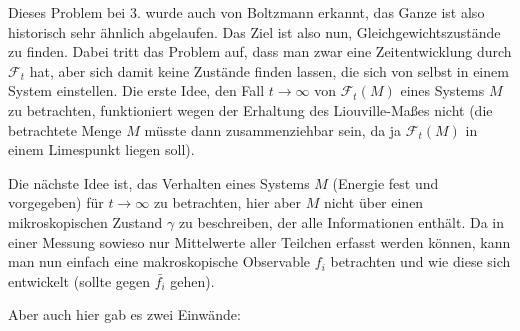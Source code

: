 \documentclass[../KlassMech_main.tex]{subfiles}
\begin{document}
Dieses Problem bei 3. wurde auch von Boltzmann erkannt, das Ganze ist also historisch sehr ähnlich abgelaufen. Das Ziel ist also nun, Gleichgewichtszustände zu finden. Dabei tritt das Problem auf, dass man zwar eine Zeitentwicklung durch $\mathcal{F}_t$ hat, aber sich damit keine Zustände finden lassen, die sich von selbst in einem System einstellen. Die erste Idee, den Fall $t\rightarrow \infty$ von $\mathcal{F}_t(M)$ eines Systems $M$ zu betrachten, funktioniert wegen der Erhaltung des Liouville-Maßes nicht (die betrachtete Menge $M$ müsste dann zusammenziehbar sein, da ja $\mathcal{F}_t(M)$ in einem Limespunkt liegen soll).

Die nächste Idee ist, das Verhalten eines Systems $M$ (Energie fest und vorgegeben) für $t\rightarrow \infty$ zu betrachten, hier aber $M$ nicht über einen mikroskopischen Zustand $\gamma$ zu beschreiben, der alle Informationen enthält. Da in einer Messung sowieso nur Mittelwerte aller Teilchen erfasst werden können, kann man nun einfach eine makroskopische Observable $f_i$ betrachten und wie diese sich entwickelt (sollte gegen $\bar{f_i}$ gehen).

Aber auch hier gab es zwei Einwände:
\end{document}
